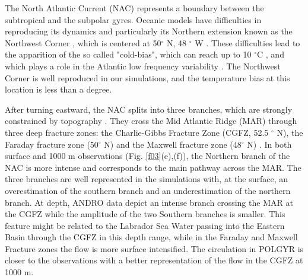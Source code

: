 \documentclass[os, manuscript]{copernicus}
\begin{document}
The North Atlantic Current (NAC) represents a boundary between the subtropical and the subpolar gyres. Oceanic models have difficulties in reproducing its dynamics and particularly its Northern extension known as the Northwest Corner \citep{bryan2007,hecht2008,drews2015}, which is centered at 50$^{\circ}$ N, 48 $^{\circ}$ W \citep{lazier1994}. These difficulties lead to the apparition of the so called "cold-bias", which can reach up to 10 $^{\circ}$C \citep{griffies2009, drews2015}, and which plays a role in the Atlantic low frequency variability \citep{drews2017}. The Northwest Corner is well reproduced in our simulations, and the temperature bias at this location is less than a degree.


After turning eastward, the NAC splits into three branches, which are strongly constrained by topography \citep{bower2008}. They cross the Mid Atlantic Ridge (MAR) through three deep fracture zones: the Charlie-Gibbs Fracture Zone (CGFZ, 52.5 $^{\circ}$ N), the Faraday fracture zone (50$^{\circ}$ N) and the Maxwell fracture zone (48$^{\circ}$ N) \citep{bower2002}. In both surface and 1000 m observations (Fig. \ref{f03}(e),(f)), the Northern branch of the NAC is more intense and corresponds to the main pathway across the MAR. The three branches are well represented in the simulations with, at the surface, an overestimation of the southern branch and an underestimation of the northern branch. At depth, ANDRO data depict an intense branch crossing the MAR at the CGFZ while the amplitude of the two Southern branches is smaller. This feature might be related to the Labrador Sea Water passing into the Eastern Basin through the CGFZ in this depth range, while in the Faraday and Maxwell Fracture zones the flow is more surface intensified. The circulation in POLGYR is closer to the observations with a better representation of the flow in the CGFZ at 1000 m. 
\end{document}
